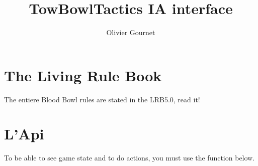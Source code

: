 \documentclass[11]{article}
\title{TowBowlTactics IA interface}
\author{Olivier Gournet}
\begin{document}
\maketitle

\section{The Living Rule Book}

The entiere Blood Bowl rules are stated in the LRB5.0, read it!

\section{L'Api}

To be able to see game state and to do actions, you must
use the function below.


\end{document}
